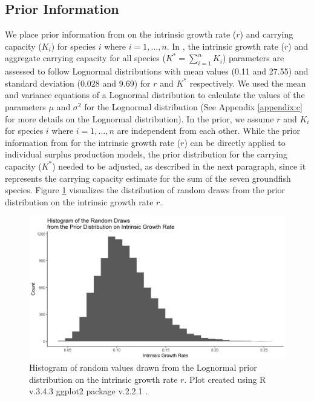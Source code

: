 \documentclass[oneside,12pt,final]{sty/ucthesis-CA2012}
\let\cite\citep                             %
\begin{document}
\begin{mainmatter}
\subsection{Prior Information}
We place prior information from \citet{langseth2018stock} on the intrinsic growth rate ($r$) and carrying capacity ($K_i$) for species $i$ where $i=1,\dots,n$. In \citet{langseth2018stock}, the intrinsic growth rate ($r$) and aggregate carrying capacity for all species ($K^*=\sum_{i=1}^{n}K_i$) parameters are assessed to follow Lognormal distributions with mean values (0.11 and 27.55) and standard deviation (0.028 and 9.69) for $r$ and $K^*$ respectively. We used the mean and variance equations of a Lognormal distribution to calculate the  values of the parameters $\mu$ and $\sigma^2$ for the Lognormal distribution (See Appendix \ref{appendix:c} for more details on the Lognormal distribution). In the prior, we assume $r$ and $K_i$ for species $i$ where $i=1,\dots,n$ are independent from each other. While the prior information from \citet{langseth2018stock} for the intrinsic growth rate ($r$) can be directly applied to individual surplus production models, the prior distribution for the carrying capacity ($K^*$) needed to be adjusted, as described in the next paragraph, since it represents the carrying capacity estimate for the sum of the seven groundfish species. Figure \ref{priorr} visualizes the distribution of random draws from the prior distribution on the intrinsic growth rate $r$.

\begin{figure}[H]
     \centering
       \includegraphics[width=.9\textwidth]{fig/hist_prior_r}
    \caption{Histogram of random values drawn from the Lognormal prior distribution on the intrinsic growth rate $r$. Plot created using R v.3.4.3 \cite{Rcite} ggplot2 package v.2.2.1 \cite{ggplot}. }
    \label{priorr}
\end{figure}


\end{mainmatter}
\end{document}
